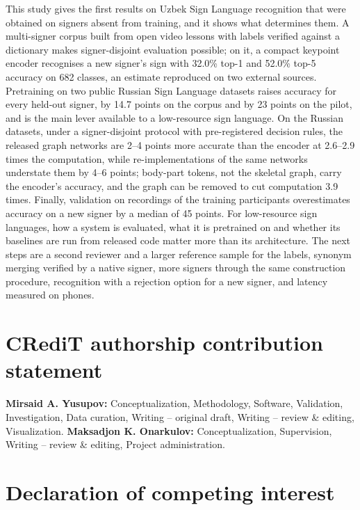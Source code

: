 \documentclass[a4paper,fleqn]{cas-dc}
\begin{document}
This study gives the first results on Uzbek Sign Language recognition that were obtained on signers absent from training, and it shows what determines them. A multi-signer corpus built from open video lessons with labels verified against a dictionary makes signer-disjoint evaluation possible; on it, a compact keypoint encoder recognises a new signer's sign with 32.0\% top-1 and 52.0\% top-5 accuracy on 682 classes, an estimate reproduced on two external sources. Pretraining on two public Russian Sign Language datasets raises accuracy for every held-out signer, by 14.7 points on the corpus and by 23 points on the pilot, and is the main lever available to a low-resource sign language. On the Russian datasets, under a signer-disjoint protocol with pre-registered decision rules, the released graph networks are 2--4 points more accurate than the encoder at 2.6--2.9 times the computation, while re-implementations of the same networks understate them by 4--6 points; body-part tokens, not the skeletal graph, carry the encoder's accuracy, and the graph can be removed to cut computation 3.9 times. Finally, validation on recordings of the training participants overestimates accuracy on a new signer by a median of 45 points. For low-resource sign languages, how a system is evaluated, what it is pretrained on and whether its baselines are run from released code matter more than its architecture. The next steps are a second reviewer and a larger reference sample for the labels, synonym merging verified by a native signer, more signers through the same construction procedure, recognition with a rejection option for a new signer, and latency measured on phones.

\hypertarget{credit-authorship-contribution-statement}{%
\section*{CRediT authorship contribution statement}\label{credit-authorship-contribution-statement}}

\textbf{Mirsaid A. Yusupov:} Conceptualization, Methodology, Software, Validation, Investigation, Data curation, Writing -- original draft, Writing -- review \& editing, Visualization. \textbf{Maksadjon K. Onarkulov:} Conceptualization, Supervision, Writing -- review \& editing, Project administration.

\hypertarget{declaration-of-competing-interest}{%
\section*{Declaration of competing interest}\label{declaration-of-competing-interest}}
\end{document}
